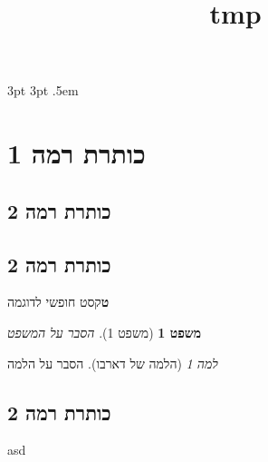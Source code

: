 
\title{tmp}
\setcounter{secnumdepth}{2}		%
\usepackage{amsthm}

{3pt}%
{3pt}%
{\itshape}%
{}%
{\bfseries}%
{}%
{.5em}%
{}

\newtheorem{theorem}{משפט}[subsection]
\theoremstyle{remark}
\newtheorem{lemma}[subsection]{למה}

\renewcommand{\thmnote}[1]{\text{#1}}


\section{כותרת רמה 1}
\subsection{כותרת רמה 2}
\subsection{כותרת רמה 2}
\meaning\textbf

טקסט חופשי לדוגמה

\show\itemize

\show\theorem

\show\th@plain
\begin{theorem}[משפט 1]
	הסבר על המשפט
\end{theorem}
\begin{lemma}[הלמה של דארבו]
	הסבר על הלמה
\end{lemma}
\subsection{כותרת רמה 2}
asd


